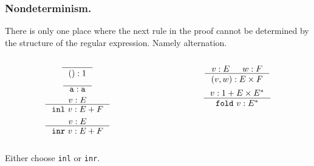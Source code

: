 \documentclass[slidestop,compress,mathserif, xcolor=table]{beamer}
\begin{document}
\begin{frame}
  \frametitle{Nondeterminism.}
  There is only one place where the next rule in the proof cannot be determined
  by the structure of the regular expression. Namely alternation.

  \begin{columns}[totalwidth=0.8\textwidth]
    \begin{column}{.5\textwidth}
      \[
      \inference{}{() : 1}
      \]
      \[
      \inference{}{\texttt{a} : \texttt{a}}
      \]
      \[
      \inference{v : E}{\mathtt{inl}\ v : E + F}
      \]
      \[
      \inference{v : E}{\mathtt{inr}\ v : E + F}
      \]
    \end{column}
    \begin{column}{.5\textwidth}
      \[
      \inference{v : E & w : F}{(v, w) : E \times F}
      \]
      \[
      \inference{v : 1 + E \times E^{\ast}}{\mathtt{fold}\ v : E^{\ast}}
      \]
    \end{column}
  \end{columns}

  \vspace{1em}
  Either choose \texttt{inl} or \texttt{inr}.
\end{frame}
\end{document}
